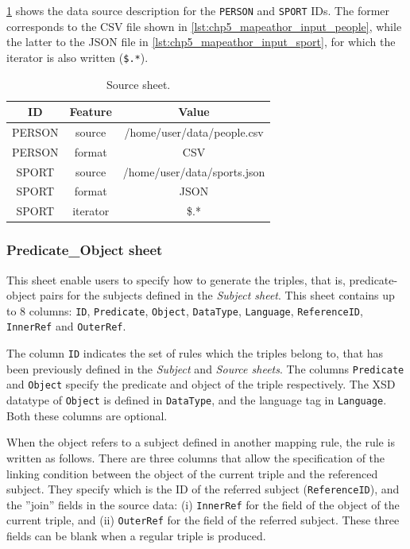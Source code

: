 \cref{tab:source_sheet} shows the data source description for the \texttt{PERSON} and \texttt{SPORT} IDs. The former corresponds to the CSV file shown in \cref{lst:chp5_mapeathor_input_people}, while the latter to the JSON file in \cref{lst:chp5_mapeathor_input_sport}, for which the iterator is also written (\texttt{\$.*}). 

\begin{table}[h!]
\caption{Source sheet.}
\label{tab:source_sheet}
\centering
\begin{tabular}{c|c|c}
\midrule
\textbf{ID} & \textbf{Feature} & \textbf{Value}              \\ \midrule
PERSON    & source          & /home/user/data/people.csv  \\
PERSON    & format          & CSV                         \\
SPORT     & source          & /home/user/data/sports.json \\
SPORT     & format          & JSON                        \\  
SPORT     & iterator        & \$.*                    \\ \midrule
\end{tabular}
\end{table}

\subsubsection{Predicate\_Object sheet} 
This sheet enable users to specify how to generate the triples, that is, predicate-object pairs for the subjects defined in the \textit{Subject sheet}. This sheet contains up to 8 columns: \texttt{ID}, \texttt{Predicate}, \texttt{Object}, \texttt{DataType}, \texttt{Language}, \texttt{ReferenceID}, \texttt{InnerRef} and \texttt{OuterRef}.

The column \texttt{ID} indicates the set of rules which the triples belong to, that has been previously defined in the \textit{Subject} and \textit{Source sheets}.
The columns \texttt{Predicate} and \texttt{Object} specify the predicate and object of the triple respectively. 
The XSD datatype of \texttt{Object} is defined in \texttt{DataType}, and the language tag in \texttt{Language}. Both these columns are optional. 

When the object refers to a subject defined in another mapping rule, the rule is written as follows. 
There are three columns that allow the specification of the linking condition between the object of the current triple and the referenced subject. 
They specify which is the ID of the referred subject  (\texttt{ReferenceID}), and the ''join'' fields in the source data: (i) \texttt{InnerRef} for the field of the object of the current triple, and (ii) \texttt{OuterRef} for the field of the referred subject. These three fields can be blank when a regular triple is produced. 

